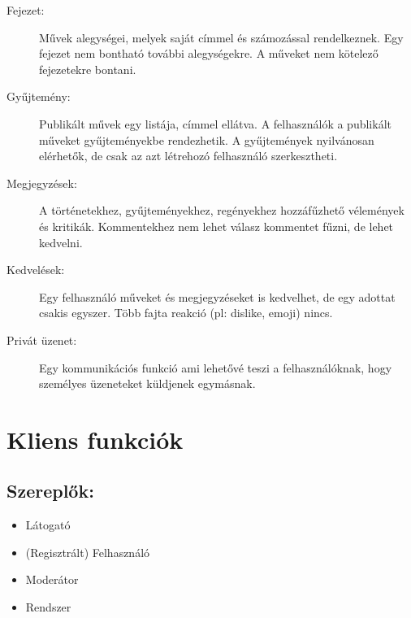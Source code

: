 \documentclass[12pt,a4paper,oneside]{article}
\begin{document}
\begin{description}
\item [Fejezet:]  Művek alegységei, melyek saját címmel és számozással rendelkeznek. Egy fejezet nem bontható további alegységekre. A műveket nem kötelező fejezetekre bontani. 

\item [Gyűjtemény:] Publikált művek egy listája, címmel ellátva. A felhasználók a publikált műveket gyűjteményekbe rendezhetik. A gyűjtemények nyilvánosan elérhetők, de csak az azt létrehozó felhasználó szerkesztheti.

\item [Megjegyzések:] A történetekhez, gyűjteményekhez, regényekhez hozzáfűzhető vélemények és kritikák. Kommentekhez nem lehet válasz kommentet fűzni, de lehet kedvelni.

\item [Kedvelések:] Egy felhasználó műveket és megjegyzéseket is kedvelhet, de egy adottat csakis egyszer. Több fajta reakció (pl: dislike, emoji) nincs.

\item [Privát üzenet:] Egy kommunikációs funkció ami lehetővé teszi a felhasználóknak, hogy személyes üzeneteket küldjenek egymásnak.
\end{description}

\section{Kliens funkciók}

\subsection{Szereplők:}
\begin{itemize}
\item Látogató
\item (Regisztrált) Felhasználó
\item Moderátor
\item Rendszer
\end{itemize}
\end{document}
